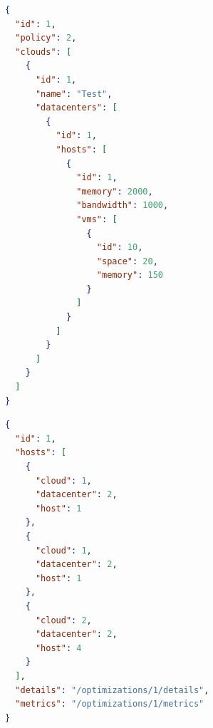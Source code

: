 \newpage
\begin{lstlisting}[language=json,firstnumber=1]
{
  "id": 1,
  "policy": 2,
  "clouds": [
    {
      "id": 1,
      "name": "Test",
      "datacenters": [
        {
          "id": 1,
          "hosts": [
            {
              "id": 1,
              "memory": 2000,
              "bandwidth": 1000,
              "vms": [
                {
                  "id": 10,
                  "space": 20,
                  "memory": 150
                }
              ]
            }
          ]
        }
      ]
    }
  ]
}
\end{lstlisting}

\begin{lstlisting}[language=json,firstnumber=1]
{
  "id": 1,
  "hosts": [
    {
      "cloud": 1,
      "datacenter": 2,
      "host": 1
    }, 
    {
      "cloud": 1,
      "datacenter": 2,
      "host": 1
    }, 
    {
      "cloud": 2,
      "datacenter": 2,
      "host": 4
    }
  ],
  "details": "/optimizations/1/details",
  "metrics": "/optimizations/1/metrics"
}
\end{lstlisting}